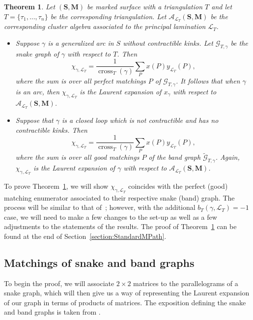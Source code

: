 \documentclass[pdftex]{sigma}
\numberwithin{equation}{section}
\newtheorem{Theorem}{Theorem}[section]
\theoremstyle{definition}
\newcommand{\SM}{(\mathbf{S}, \mathbf{M})}
\begin{document}
\begin{Theorem}\label{thm:matrixformulalamination}
 Let $\SM$ be marked surface with a triangulation $T$ and let $T=\{\tau_1,\ldots, \tau_n\}$ be the corresponding triangulation. Let $\mathcal{A}_{\mathcal{L}_T}\SM$ be the corresponding cluster algebra associated to the principal lamination $\mathcal{L}_T$.
 \begin{itemize}\itemsep=0pt
\item Suppose $\gamma$ is a generalized arc in $S$ without contractible kinks. Let $\mathcal{G}_{T,\gamma}$ be the snake graph of $\gamma$ with respect to $T$. Then \[
 \chi_{\gamma, \mathcal{L}_T}=\frac{1}{\operatorname{cross}_T(\gamma)}\sum_{P}x(P)y_{\mathcal{L}_T}(P),
 \]
where the sum is over all perfect matchings $P$ of $\mathcal{G}_{T,\gamma}$. It follows that when $\gamma$ is an arc, then $\chi_{\gamma, \mathcal{L}_T}$ is the Laurent expansion of $x_\gamma$ with respect to $\mathcal{A}_{\mathcal{L}_T}\SM$.
 \item Suppose that $\gamma$ is a closed loop which is not contractible and has no contractible kinks. Then
\[\chi_{\gamma, \mathcal{L}_T}=\frac{1}{\operatorname{cross}_T(\gamma)}\sum_{P}x(P)y_{\mathcal{L}_T}(P),\] where the sum is over all good matchings $P$ of the band graph $\widetilde{\mathcal{G}}_{T, \gamma}$. Again, $\chi_{\gamma, \mathcal{L}_T}$ is the Laurent expansion of $\gamma$ with respect to $\mathcal{A}_{\mathcal{L}_T}\SM$.
 \end{itemize}
\end{Theorem}

To prove Theorem~\ref{thm:matrixformulalamination}, we will show $\chi_{\gamma, \mathcal{L}_T}$ coincides with the perfect (good) matching enumerator associated to their respective snake (band) graph. The process will be similar to that of~\cite{MW13}; however, with the additional $b_T(\gamma, \mathcal{L}_T)=-1$ case, we will need to make a few changes to the set-up as well as a few adjustments to the statements of the results. The proof of Theorem~\ref{thm:matrixformulalamination} can be found at the end of Section~\ref{section:StandardMPath}.

\subsection{Matchings of snake and band graphs}

To begin the proof, we will associate $2\times 2$ matrices to the parallelograms of a snake graph, which will then give us a way of representing the Laurent expansion of our graph in terms of products of matrices. The exposition defining the snake and band graphs is taken from \cite{MW13}.
\end{document}
